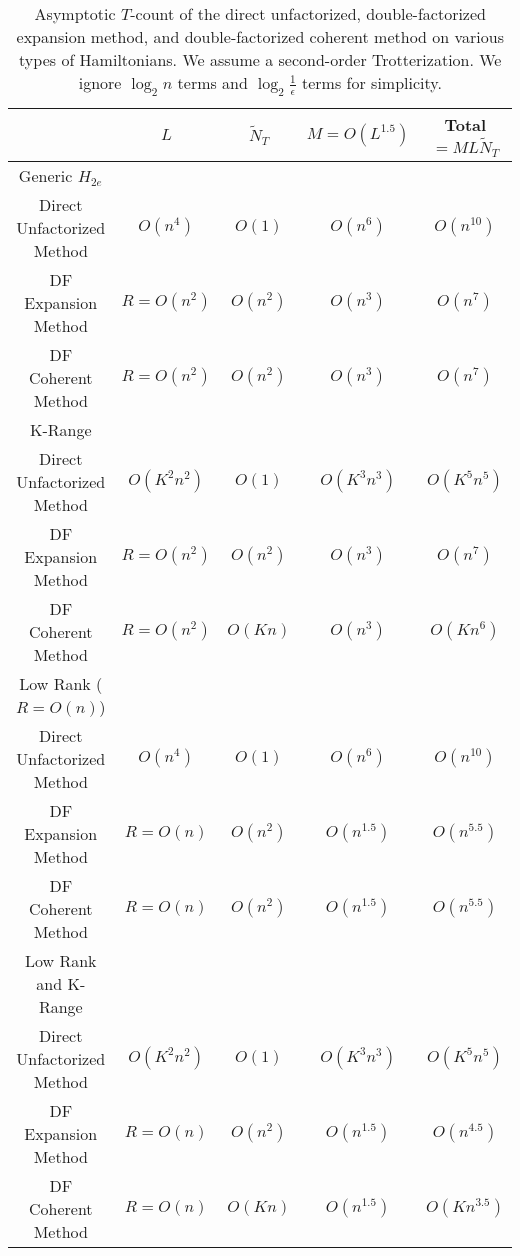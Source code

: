 \begin{table}[h!]
    \centering
    \renewcommand{\arraystretch}{1.25}
    \begin{tabular}{||c c c c c||} 
        \hline
         & $L$ & $\tilde{N}_T$ & $M = O(L^{1.5})$ & Total $= ML\tilde{N}_T$ \\
        \hline\hline
        Generic $H_{2e}$ & & & & \\
        \hline
        Direct Unfactorized Method & $O(n^4)$ & $O(1)$ & $O(n^6)$ & $O(n^{10})$ \\ 
        DF Expansion Method & $R = O(n^2)$ & $O(n^2)$ & $O(n^3)$ & $O(n^7)$ \\
        DF Coherent Method & $R = O(n^2)$ & $O(n^2)$ & $O(n^3)$ & $O(n^7)$ \\
        \hline\hline
        K-Range & & & & \\
        \hline
        Direct Unfactorized Method & $O(K^2n^2)$ & $O(1)$ & $O(K^3n^3)$ & $O(K^5n^5)$ \\ 
        DF Expansion Method & $R = O(n^2)$ & $O(n^2)$ & $O(n^3)$ & $O(n^7)$ \\
        DF Coherent Method & $R = O(n^2)$ & $O(Kn)$ & $O(n^3)$ & $O(Kn^6)$ \\
        \hline\hline
        Low Rank ($R = O(n)$) & & & & \\
        \hline
        Direct Unfactorized Method & $O(n^4)$ & $O(1)$ & $O(n^6)$ & $O(n^{10})$ \\ 
        DF Expansion Method & $R = O(n)$ & $O(n^2)$ & $O(n^{1.5})$ & $O(n^{5.5})$ \\
        DF Coherent Method & $R = O(n)$ & $O(n^2)$ & $O(n^{1.5})$ & $O(n^{5.5})$ \\
        \hline\hline
        Low Rank and K-Range & & & & \\
        \hline
        Direct Unfactorized Method & $O(K^2n^2)$ & $O(1)$ & $O(K^3n^3)$ & $O(K^5n^5)$ \\ 
        DF Expansion Method & $R = O(n)$ & $O(n^2)$ & $O(n^{1.5})$ & $O(n^{4.5})$ \\
        DF Coherent Method & $R = O(n)$ & $O(Kn)$ & $O(n^{1.5})$ & $O(Kn^{3.5})$ \\
        \hline
    \end{tabular}
    \caption{Asymptotic $T$-count of the direct unfactorized, double-factorized expansion method, and double-factorized coherent method on various types of Hamiltonians. We assume a second-order Trotterization. We ignore $\log_2{n}$ terms and $\log_2{\frac{1}{\epsilon}}$ terms for simplicity.}
    \label{table:1}
\end{table}

